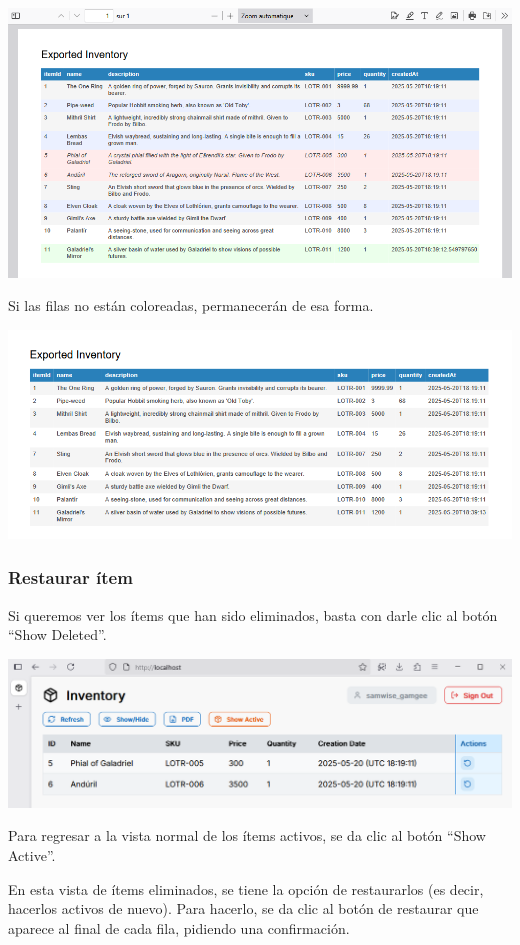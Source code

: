 \includegraphics[width=\textwidth]{images/20 PDF Colores}

Si las filas no están coloreadas, permanecerán de esa forma.

\includegraphics[width=\textwidth]{images/21 PDF Actualizado}

\subsubsection{Restaurar ítem}

Si queremos ver los ítems que han sido eliminados, basta con darle clic al botón “Show Deleted”.

\includegraphics[width=\textwidth]{images/22 Eliminados}

Para regresar a la vista normal de los ítems activos, se da clic al botón “Show Active”.

En esta vista de ítems eliminados, se tiene la opción de restaurarlos (es decir, hacerlos activos de nuevo). Para hacerlo, se da clic al botón de restaurar que aparece al final de cada fila, pidiendo una confirmación.

